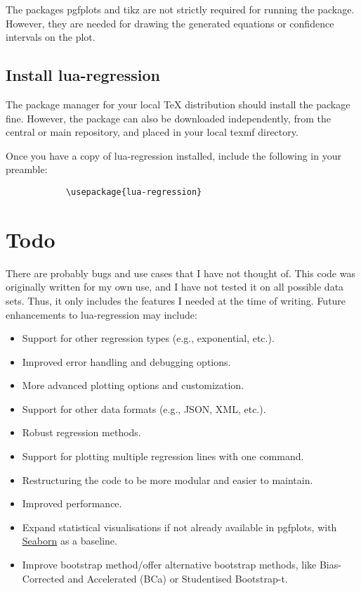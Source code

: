 \documentclass[11pt]{article}
\begin{document}
    The packages {\ttfamily pgfplots} and {\ttfamily tikz} are not strictly required for running the package.
    However, they are needed for drawing the generated equations or confidence intervals on the plot.

    \subsection{Install {\ttfamily lua-regression}}

    The package manager for your local TeX distribution should install the package fine.
    However, the package can also be downloaded independently, from the central or main repository, and placed in your local texmf directory.
   
	Once you have a copy of {\ttfamily lua-regression} installed, include the following in your preamble:

	\begin{codebox}
		\begin{verbatim}
		    \usepackage{lua-regression}
		\end{verbatim}
	\end{codebox}

    \section{Todo}

    There are probably bugs and use cases that I have not thought of.
    This code was originally written for my own use, and I have not tested it on all possible data sets.
    Thus, it only includes the features I needed at the time of writing.
    Future enhancements to {\ttfamily lua-regression} may include:

    \begin{itemize}
        \item Support for other regression types (e.g., exponential, etc.).
        \item Improved error handling and debugging options.
        \item More advanced plotting options and customization.
        \item Support for other data formats (e.g., JSON, XML, etc.).
        \item Robust regression methods.
        \item Support for plotting multiple regression lines with one command.
        \item Restructuring the code to be more modular and easier to maintain.
        \item Improved performance.
        \item Expand statistical visualisations if not already available in pgfplots, with \href{https://seaborn.pydata.org/}{Seaborn} as a baseline.
        \item Improve bootstrap method/offer alternative bootstrap methods, like Bias-Corrected and Accelerated (BCa) or Studentised Bootstrap-t.
    \end{itemize}
\end{document}
